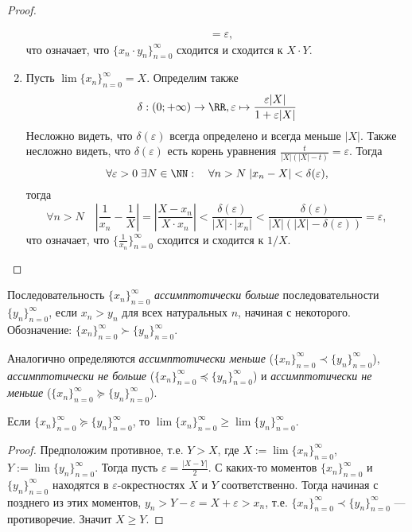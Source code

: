 \documentclass[12pt,a4paper]{article}
\begin{document}
\begin{proof}
\begin{enumerate}
\begin{align*}
                    &= \varepsilon,
                \end{align*}
                что означает, что $\{x_n \cdot y_n\}_{n=0}^\infty$ сходится и сходится к $X \cdot Y$.
            \item Пусть $\lim \{x_n\}_{n=0}^\infty = X$. Определим также
                \[\delta: (0; +\infty) \to \RR, \varepsilon \mapsto \frac{\varepsilon |X|}{1 + \varepsilon |X|}\]
                Несложно видеть, что $\delta(\varepsilon)$ всегда определено и всегда меньше $|X|$. Также несложно видеть, что $\delta(\varepsilon)$ есть корень уравнения $\frac{t}{|X|(|X| - t)} = \varepsilon$. Тогда
                \[\forall \varepsilon > 0\; \exists N \in \NN:\quad \forall n > N\; |x_n - X| < \delta(\varepsilon),\]
                тогда
                \[\forall n > N\quad \left|\frac{1}{x_n} - \frac{1}{X}\right| = \left|\frac{X-x_n}{X\cdot x_n}\right| < \frac{\delta(\varepsilon)}{|X| \cdot |x_n|} < \frac{\delta(\varepsilon)}{|X|(|X|-\delta(\varepsilon))} = \varepsilon,\]
                что означает, что $\{\frac{1}{x_n}\}_{n=0}^\infty$ сходится и сходится к $1/X$.
        \end{enumerate}
    \end{proof}

    \begin{definition}
        Последовательность $\{x_n\}_{n=0}^\infty$ \emph{ассимптотически больше} последовательности $\{y_n\}_{n=0}^\infty$, если $x_n > y_n$ для всех натуральных $n$, начиная с некоторого. Обозначение: $\{x_n\}_{n=0}^\infty \succ \{y_n\}_{n=0}^\infty$.

        Аналогично определяются \emph{ассимптотически меньше} ($\{x_n\}_{n=0}^\infty \prec \{y_n\}_{n=0}^\infty$), \emph{ассимптотически не больше} ($\{x_n\}_{n=0}^\infty \preccurlyeq \{y_n\}_{n=0}^\infty$) и \emph{ассимптотически не меньше} ($\{x_n\}_{n=0}^\infty \succcurlyeq \{y_n\}_{n=0}^\infty$).
    \end{definition}

    \begin{statement}\label{stupid_seq_statement_1}
        Если $\{x_n\}_{n=0}^\infty \succcurlyeq \{y_n\}_{n=0}^\infty$, то $\lim \{x_n\}_{n=0}^\infty \geqslant \lim \{y_n\}_{n=0}^\infty$.
    \end{statement}

    \begin{proof}
        Предположим противное, т.е. $Y > X$, где $X := \lim \{x_n\}_{n=0}^\infty$, $Y := \lim \{y_n\}_{n=0}^\infty$. Тогда пусть $\varepsilon = \frac{|X - Y|}{2}$. С каких-то моментов $\{x_n\}_{n=0}^\infty$ и $\{y_n\}_{n=0}^\infty$ находятся в $\varepsilon$-окрестностях $X$ и $Y$ соответственно. Тогда начиная с позднего из этих моментов, $y_n > Y - \varepsilon = X + \varepsilon > x_n$, т.е. $\{x_n\}_{n=0}^\infty \prec \{y_n\}_{n=0}^\infty$ --- противоречие. Значит $X \geqslant Y$.
    \end{proof}
\end{document}
